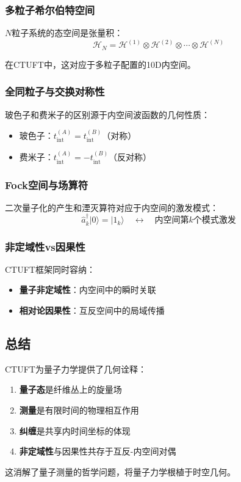 \subsubsection{多粒子希尔伯特空间}

$N$粒子系统的态空间是张量积：
\begin{equation}
    \mathcal{H}_N = \mathcal{H}^{(1)} \otimes \mathcal{H}^{(2)} \otimes \cdots \otimes \mathcal{H}^{(N)}
\end{equation}

在CTUFT中，这对应于多粒子配置的10D内空间。

\subsubsection{全同粒子与交换对称性}

\begin{insight}[统计作为几何]
玻色子和费米子的区别源于内空间波函数的几何性质：
\begin{itemize}
    \item 玻色子：$t_{\text{int}}^{(A)} = t_{\text{int}}^{(B)}$（对称）
    \item 费米子：$t_{\text{int}}^{(A)} = -t_{\text{int}}^{(B)}$（反对称）
\end{itemize}
\end{insight}

\subsubsection{Fock空间与场算符}

二次量子化的产生和湮灭算符对应于内空间的激发模式：
\begin{equation}
    \hat{a}_k^\dagger |0\rangle = |1_k\rangle \quad \leftrightarrow \quad \text{内空间第}k\text{个模式激发}
\end{equation}

\subsubsection{非定域性vs因果性}

CTUFT框架同时容纳：
\begin{itemize}
    \item \textbf{量子非定域性}：内空间中的瞬时关联
    \item \textbf{相对论因果性}：互反空间中的局域传播
\end{itemize}

\subsection{总结}

CTUFT为量子力学提供了几何诠释：
\begin{enumerate}
    \item \textbf{量子态}是纤维丛上的旋量场
    \item \textbf{测量}是有限时间的物理相互作用
    \item \textbf{纠缠}是共享内时间坐标的体现
    \item \textbf{非定域性}与因果性共存于互反-内空间对偶
\end{enumerate}

这消解了量子测量的哲学问题，将量子力学根植于时空几何。
